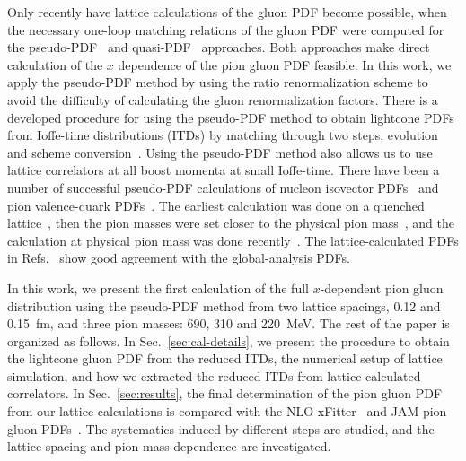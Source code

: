 Only recently have lattice calculations of the gluon PDF become possible, when the necessary one-loop matching relations of the gluon PDF were computed for the pseudo-PDF~\cite{Balitsky:2019krf} and quasi-PDF~\cite{Zhang:2018diq,Wang:2019tgg} approaches.
Both approaches make direct calculation of the $x$ dependence of the pion gluon PDF feasible.
In this work, we apply the pseudo-PDF method by using the ratio renormalization scheme to avoid the difficulty of calculating the gluon renormalization factors.
There is a developed procedure for using the pseudo-PDF method to obtain lightcone PDFs from Ioffe-time distributions (ITDs) by matching through two steps, evolution and scheme conversion~\cite{Radyushkin:2018cvn}.
Using the pseudo-PDF method also allows us to use lattice correlators at all boost momenta at small Ioffe-time.
There have been a number of successful pseudo-PDF calculations of nucleon isovector
PDFs~\cite{Orginos:2017kos,Joo:2019jct,Joo:2020spy,Bhat:2020ktg} and pion valence-quark PDFs~\cite{Joo:2019bzr}.
The earliest calculation was done on a quenched lattice~\cite{Orginos:2017kos}, then the pion masses were set closer to the physical pion mass~\cite{Joo:2019jct,Joo:2019bzr,Joo:2020spy}, and the calculation at physical pion mass was done recently~\cite{Bhat:2020ktg}.
The lattice-calculated PDFs in Refs.~\cite{Joo:2019jct,Joo:2019bzr,Joo:2020spy,Bhat:2020ktg} show good agreement with the global-analysis PDFs.

In this work, we present the first calculation of the full $x$-dependent pion gluon distribution using the pseudo-PDF method from two lattice spacings, 0.12 and 0.15~fm, and three pion masses: 690, 310 and 220~MeV.
The rest of the paper is organized as follows.
In Sec.~\ref{sec:cal-details}, we present the procedure to obtain the lightcone gluon PDF from the reduced ITDs,
the numerical setup of lattice simulation, and how we extracted the reduced ITDs from lattice calculated correlators.
In Sec.~\ref{sec:results}, the final determination of the pion gluon PDF from our lattice calculations is compared with the NLO xFitter~\cite{Novikov:2020snp} and JAM pion gluon PDFs~\cite{Barry:2018ort,Cao:2021aci}.
The systematics induced by different steps are studied, and the lattice-spacing and pion-mass dependence are investigated.

